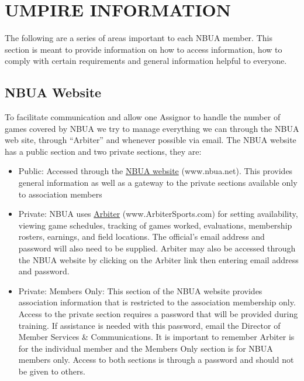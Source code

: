 \documentclass[letterpaper,11pt,colorlinks=true,allcolors=blue]{article}
\begin{document}
\newpage
\section{UMPIRE INFORMATION}
The following are a series of areas important to each NBUA member. This section is meant to provide information on how to access information, how to comply with certain requirements and general information helpful to everyone. 

\subsection*{NBUA Website}
To facilitate communication and allow one Assignor to handle the number of games covered by NBUA we try to manage everything we can through the NBUA web site, through “Arbiter” and whenever possible via email. The NBUA website has a public section and two private sections, they are:
\begin{itemize}
\item  Public: Accessed through the \href{http://www.nbua.net/}{NBUA website} (www.nbua.net). This provides general information as well as a gateway to the private sections available only to association members
\item  Private: NBUA uses \href{http://www.ArbiterSports.com/}{Arbiter} (www.ArbiterSports.com) for setting availability, viewing game schedules, tracking of games worked, evaluations, membership rosters, earnings, and field locations.  The official's email address and password will also need to be supplied. Arbiter may also be accessed through the NBUA website by clicking on the Arbiter link then entering email address and password.  
\item  Private: Members Only: This section of the NBUA website provides association information that is restricted to the association membership only. Access to the private section requires a  password that will be provided during training. If assistance is needed with this password, email the Director of Member Services \& Communications. It is important to remember Arbiter is for the individual member and the Members Only section is for NBUA members only. Access to both sections is through a password and should not be given to others. 
\end{itemize}
\end{document}
